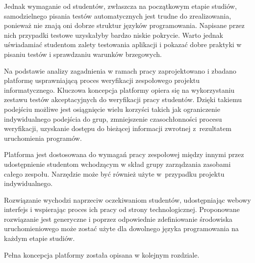 Jednak wymaganie od studentów, zwłaszcza na początkowym etapie studiów, samodzielnego pisania testów automatycznych jest trudne do zrealizowania, ponieważ nie znają oni dobrze struktur języków programowania.
Napisane przez nich przypadki testowe uzyskałyby bardzo niskie pokrycie.
Warto jednak uświadamiać studentom zalety testowania aplikacji i pokazać dobre praktyki w pisaniu testów i sprawdzaniu warunków brzegowych.

Na podstawie analizy zagadnienia w ramach pracy zaprojektowano i zbadano platformę usprawniającą proces weryfikacji zespołowego projektu informatycznego.
Kluczowa koncepcja platformy opiera się na wykorzystaniu zestawu testów akceptacyjnych do weryfikacji pracy studentów.
Dzięki takiemu podejściu możliwe jest osiągnięcie wielu korzyści takich jak ograniczenie indywidualnego podejścia do grup, zmniejszenie czasochłonności procesu weryfikacji, uzyskanie dostępu do bieżącej informacji zwrotnej z~rezultatem uruchomienia programów.

Platforma jest dostosowana do wymagań pracy zespołowej między innymi przez udostępnienie studentom wchodzącym w skład grupy zarządzania zasobami całego zespołu.
Narzędzie może być również użyte w~przypadku projektu indywidualnego.

Rozwiązanie wychodzi naprzeciw oczekiwaniom studentów, udostępniając webowy interfejs i wspierając proces ich pracy od strony technologicznej.
Proponowane rozwiązanie jest generyczne i poprzez odpowiednie zdefiniowanie środowiska uruchomieniowego może zostać użyte dla dowolnego języka programowania na każdym etapie studiów.


Pełna koncepcja platformy została opisana w kolejnym rozdziale.




